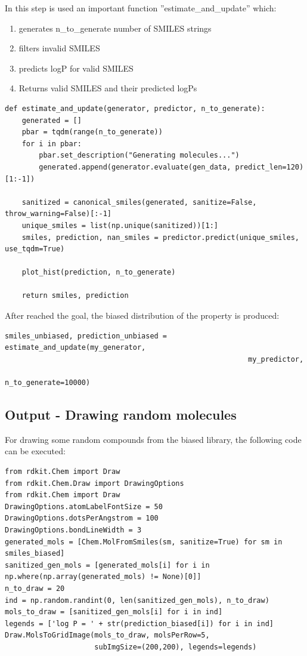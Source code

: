 \documentclass[a4paper]{article}
\begin{document}
In this step is used an important function ''estimate\_and\_update'' which:
\begin{enumerate}
	\item generates n\_to\_generate number of SMILES strings
	\item filters invalid SMILES
	\item predicts logP for valid SMILES
	\item Returns valid SMILES and their predicted logPs
\end{enumerate}

\begin{lstlisting}
def estimate_and_update(generator, predictor, n_to_generate):
    generated = []
    pbar = tqdm(range(n_to_generate))
    for i in pbar:
        pbar.set_description("Generating molecules...")
        generated.append(generator.evaluate(gen_data, predict_len=120)[1:-1])

    sanitized = canonical_smiles(generated, sanitize=False, throw_warning=False)[:-1]
    unique_smiles = list(np.unique(sanitized))[1:]
    smiles, prediction, nan_smiles = predictor.predict(unique_smiles, use_tqdm=True)  
                                                       
    plot_hist(prediction, n_to_generate)
        
    return smiles, prediction
\end{lstlisting}

After reached the goal, the biased distribution of the property is produced:

\begin{lstlisting}
smiles_unbiased, prediction_unbiased = estimate_and_update(my_generator,
														 my_predictor,
														 n_to_generate=10000)
\end{lstlisting}

\subsection{Output - Drawing random molecules}\label{sec:Output - Drawing random molecules}

For drawing some random compounds from the biased library, the following code can be executed:

\begin{lstlisting}
from rdkit.Chem import Draw
from rdkit.Chem.Draw import DrawingOptions
from rdkit.Chem import Draw
DrawingOptions.atomLabelFontSize = 50
DrawingOptions.dotsPerAngstrom = 100
DrawingOptions.bondLineWidth = 3
generated_mols = [Chem.MolFromSmiles(sm, sanitize=True) for sm in smiles_biased]
sanitized_gen_mols = [generated_mols[i] for i in np.where(np.array(generated_mols) != None)[0]]
n_to_draw = 20
ind = np.random.randint(0, len(sanitized_gen_mols), n_to_draw)
mols_to_draw = [sanitized_gen_mols[i] for i in ind]
legends = ['log P = ' + str(prediction_biased[i]) for i in ind]
Draw.MolsToGridImage(mols_to_draw, molsPerRow=5, 
                     subImgSize=(200,200), legends=legends)
\end{lstlisting}
\end{document}
